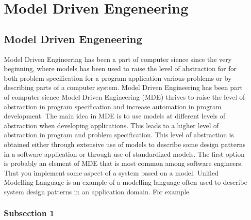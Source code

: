 
\chapter{Model Driven Engeneering} %

\label{Chapter2} %



\section{Model Driven Engeneering}

Model Driven Engineering has been a part of computer sience since the very
beginning, where models has been used to raise the level of abstraction for for
both problem specification for a program application  various problems or by
describing parts of a computer system.
Model Driven Engineering has been part of computer sience Model Driven
Engineering (MDE)\cite{France2007} thrives to raise the level of abstraction in
program specification and increase automation in program development. The main
idea in MDE is to use models at different levels of abstraction when developing
applications. This leads to a higher level of abstraction in program and
problem specification. This level of abstraction is obtained either through
extensive use of models to describe some design patterns in a software
application or through use of standardized models. The first option is probably
an element of MDE that is most common among software engineers. That you
implement some aspect of a system based on a model. Unified Modelling
Language\cite{UML} is an example of a modelling language often used to describe
system design patterns in an application domain. For example 

\subsection{Subsection 1}



